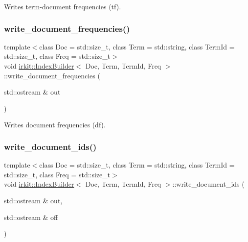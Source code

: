 Writes term-\/document frequencies (tf). 

\mbox{\label{classirkit_1_1IndexBuilder_a57c15d23588f70b78b49a6392ef61be8}} 
\subsubsection{\texorpdfstring{write\+\_\+document\+\_\+frequencies()}{write\_document\_frequencies()}}
{\footnotesize\ttfamily template$<$class Doc  = std\+::size\+\_\+t, class Term  = std\+::string, class Term\+Id  = std\+::size\+\_\+t, class Freq  = std\+::size\+\_\+t$>$ \\
void \mbox{\hyperlink{classirkit_1_1IndexBuilder}{irkit\+::\+Index\+Builder}}$<$ Doc, Term, Term\+Id, Freq $>$\+::write\+\_\+document\+\_\+frequencies (\begin{DoxyParamCaption}\item[{std\+::ostream \&}]{out }\end{DoxyParamCaption})\hspace{0.3cm}{\ttfamily [inline]}}



Writes document frequencies (df). 

\mbox{\label{classirkit_1_1IndexBuilder_af8d8c6c446a064ec7c9b2a05b522555e}} 
\subsubsection{\texorpdfstring{write\+\_\+document\+\_\+ids()}{write\_document\_ids()}}
{\footnotesize\ttfamily template$<$class Doc  = std\+::size\+\_\+t, class Term  = std\+::string, class Term\+Id  = std\+::size\+\_\+t, class Freq  = std\+::size\+\_\+t$>$ \\
void \mbox{\hyperlink{classirkit_1_1IndexBuilder}{irkit\+::\+Index\+Builder}}$<$ Doc, Term, Term\+Id, Freq $>$\+::write\+\_\+document\+\_\+ids (\begin{DoxyParamCaption}\item[{std\+::ostream \&}]{out,  }\item[{std\+::ostream \&}]{off }\end{DoxyParamCaption})\hspace{0.3cm}{\ttfamily [inline]}}



